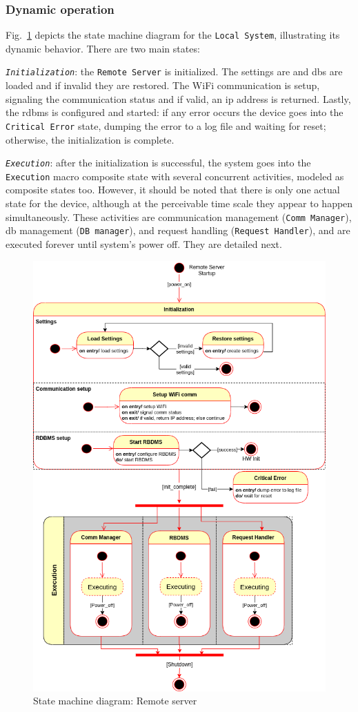 \subsubsection{Dynamic operation}
\label{sec:dyn-oper-2}
Fig.~\ref{fig:state-mach-rs} depicts the state machine diagram for the
\texttt{Local System}, illustrating its dynamic behavior. There are two main
states:
\begin{item-c}
\item \emph{\texttt{Initialization}}: the \texttt{Remote Server} is initialized. The settings are
  and \gls{db}s are loaded and if invalid they are restored. The WiFi
  communication is setup, signaling the communication status and if valid, an
  \gls{ip} address is returned. Lastly, the \gls{rdbms} is configured and started: if any error
  occurs the device goes into the \texttt{Critical Error} state, dumping the
  error to a log file and waiting for reset; otherwise, the initialization is
  complete.
\item \emph{\texttt{Execution}}: after the initialization is successful, the
  system goes into the \texttt{Execution} macro composite state with several
  concurrent activities, modeled as composite states too. However, it should be
  noted that there is only one actual state for the device, although at the
  perceivable time scale they appear to happen simultaneously. These activities
  are communication management (\texttt{Comm Manager}), \gls{db} management
  (\texttt{DB manager}), and request handling (\texttt{Request Handler}), and
  are executed forever until system's power off. They are detailed next.
\end{item-c}
%
\begin{figure}[htb!]
\centering
    \includegraphics[width=0.7\columnwidth]{./img/state-mach-rs.png}
  \caption{State machine diagram: Remote server}%
\label{fig:state-mach-rs}
\end{figure}
%
%
